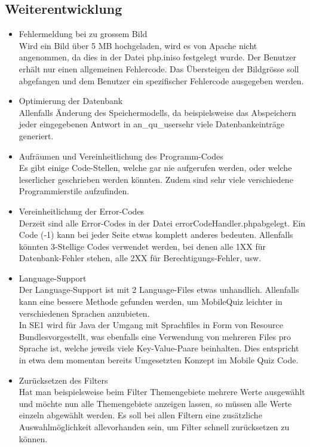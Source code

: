 \subsection{Weiterentwicklung}

\begin{itemize}
	\item Fehlermeldung bei zu grossem Bild\\
	Wird ein Bild über 5 MB  hochgeladen, wird es von Apache nicht angenommen, da dies in der Datei \glqq php.ini\grqq so festgelegt wurde. Der Benutzer erhält nur einen allgemeinen Fehlercode. Das Übersteigen der Bildgrösse soll abgefangen und dem Benutzer ein spezifischer Fehlercode ausgegeben werden.

	\item Optimierung der Datenbank\\
	Allenfalls Änderung des Speichermodells, da beispielsweise das Abspeichern jeder eingegebenen Antwort in \glqq an\_qu\_user\grqq sehr viele Datenbankeinträge generiert.

	\item Aufräumen und Vereinheitlichung des Programm-Codes\\
	Es gibt einige Code-Stellen, welche gar nie aufgerufen werden, oder welche leserlicher geschrieben werden könnten. Zudem sind sehr viele verschiedene Programmierstile aufzufinden.

	\item Vereinheitlichung der Error-Codes\\
	Derzeit sind alle Error-Codes in der Datei \glqq errorCodeHandler.php\grqq abgelegt. Ein Code (-1) kann bei jeder Seite etwas komplett anderes bedeuten. Allenfalls könnten 3-Stellige Codes verwendet werden, bei denen alle 1XX für Datenbank-Fehler stehen, alle 2XX für Berechtigungs-Fehler, usw.

	\item Language-Support\\
	Der Language-Support ist mit 2 Language-Files etwas unhandlich. Allenfalls kann eine bessere Methode gefunden werden, um MobileQuiz leichter in verschiedenen Sprachen anzubieten.\\
	In \acrfull{SE1} wird für Java der Umgang mit Sprachfiles in Form von \glqq Resource Bundles\grqq vorgestellt, was ebenfalls eine Verwendung von mehreren Files pro Sprache ist, welche jeweils viele Key-Value-Paare beinhalten. Dies entspricht in etwa dem momentan bereits Umgesetzten Konzept im Mobile Quiz Code.
	
	\item Zurücksetzen des Filters\\
	Hat man beispielsweise beim Filter Themengebiete mehrere Werte ausgewählt und möchte nun alle Themengebiete anzeigen lassen, so müssen alle Werte einzeln abgewählt werden. Es soll bei allen Filtern eine zusätzliche Auswahlmöglichkeit \glqq alle\grqq vorhanden sein, um Filter schnell zurücksetzen zu können.
	

\end{itemize}
